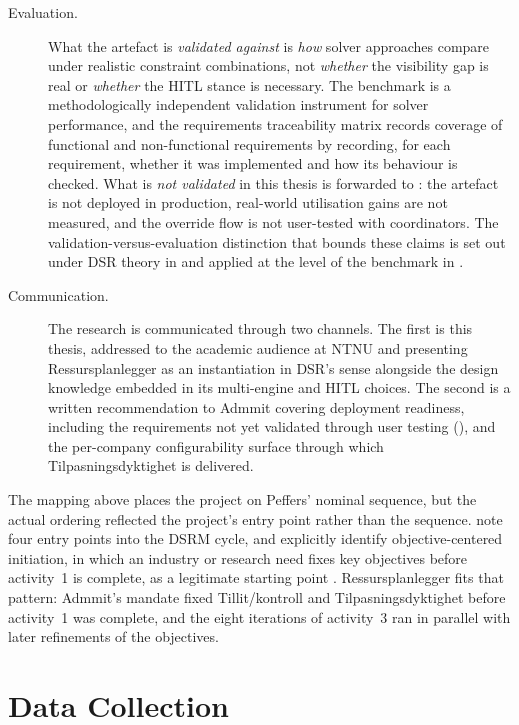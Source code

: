 \begin{description}
  \item[Evaluation.] What the artefact is \emph{validated against} is \emph{how} solver approaches compare under realistic constraint combinations, not \emph{whether} the visibility gap is real or \emph{whether} the HITL stance is necessary. The benchmark is a methodologically independent validation instrument for solver performance, and the requirements traceability matrix records coverage of functional and non-functional requirements by recording, for each requirement, whether it was implemented and how its behaviour is checked. What is \emph{not validated} in this thesis is forwarded to : the artefact is not deployed in production, real-world utilisation gains are not measured, and the override flow is not user-tested with coordinators. The validation-versus-evaluation distinction that bounds these claims is set out under DSR theory in  and applied at the level of the benchmark in .
  \item[Communication.] The research is communicated through two channels. The first is this thesis, addressed to the academic audience at NTNU and presenting Ressursplanlegger as an instantiation in DSR's sense alongside the design knowledge embedded in its multi-engine and HITL choices. The second is a written recommendation to Admmit covering deployment readiness, including the requirements not yet validated through user testing (), and the per-company configurability surface through which Tilpasningsdyktighet is delivered.
\end{description}

The mapping above places the project on Peffers' nominal sequence, but the actual ordering reflected the project's entry point rather than the sequence. \textcite{peffers2007dsrm} note four entry points into the DSRM cycle, and explicitly identify objective-centered initiation, in which an industry or research need fixes key objectives before activity~1 is complete, as a legitimate starting point \parencite[p.~56]{peffers2007dsrm}. Ressursplanlegger fits that pattern: Admmit's mandate fixed Tillit/kontroll and Tilpasningsdyktighet before activity~1 was complete, and the eight iterations of activity~3 ran in parallel with later refinements of the objectives.


\section{Data Collection}
\label{sec:data-collection}


